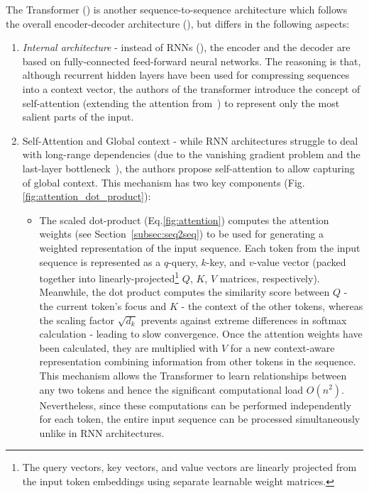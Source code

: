 The Transformer (\cite{vaswani2017attention}) is another sequence-to-sequence architecture which follows the overall encoder-decoder architecture (\cite{sutskever2014sequence}), but differs in the following aspects:
\begin{enumerate}
    \item \emph{Internal architecture} - instead of RNNs (\cite{cho-etal-2014-learning}), the encoder and the decoder are based on fully-connected feed-forward neural networks.
    The reasoning is that, although recurrent hidden layers have been used for compressing sequences into a context vector, the authors of the transformer introduce the concept of self-attention (extending the attention from~\cite{bahdanau2016neural}) to represent only the most salient parts of the input.
    \item Self-Attention and Global context - while RNN architectures struggle to deal with long-range dependencies (due to the vanishing gradient problem and the last-layer bottleneck~\cite{bahdanau2016neural}), the authors propose
    self-attention to allow capturing of global context.
    This mechanism has two key components (Fig.\ref{fig:attention_dot_product}):
    \begin{itemize}
        \item The scaled dot-product (Eq.\ref{fig:attention}) computes the attention weights (see Section~\ref{subsec:seq2seq}) to be used for generating a weighted representation of the input sequence.
        Each token from the input sequence is represented as a $q$-query, $k$-key, and $v$-value vector (packed together into linearly-projected\footnote{
            The query vectors, key vectors, and value vectors are linearly projected from the input token embeddings using separate learnable weight matrices.
        } $Q$, $K$, $V$ matrices, respectively).
        Meanwhile, the dot product computes the similarity score between $Q$ - the current token's focus and $K$ - the context of the other tokens, whereas the scaling factor $\sqrt{d_{k}}$ prevents against extreme differences in softmax calculation - leading to slow convergence.
        Once the attention weights have been calculated, they are multiplied with $V$ for a new context-aware representation combining information from other tokens in the sequence.
        This mechanism allows the Transformer to learn relationships between any two tokens and hence the significant computational load $O(n^2)$.
        Nevertheless, since these computations can be performed independently for each token, the entire input sequence can be processed simultaneously unlike in RNN architectures.


\end{itemize}
\end{enumerate}
